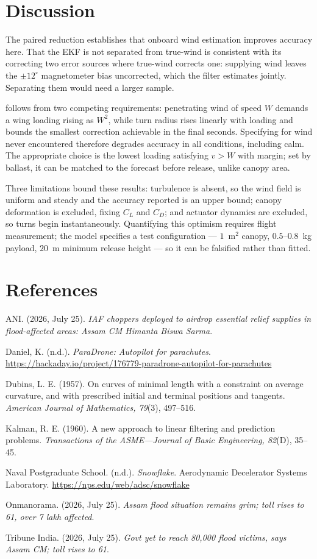 \documentclass[11pt,a4paper]{article}
\begin{document}
\section{Discussion}

The paired reduction establishes that onboard wind estimation improves accuracy
here. That the EKF is not separated from true-wind is consistent with its
correcting two error sources where true-wind corrects one: supplying wind leaves
the $\pm12^{\circ}$ magnetometer bias uncorrected, which the filter estimates
jointly. Separating them would need a larger sample.

 follows from two competing requirements: penetrating wind of
speed $W$ demands a wing loading rising as $W^{2}$, while turn radius rises
linearly with loading and bounds the smallest correction achievable in the final
seconds. Specifying for wind never encountered therefore degrades accuracy in all
conditions, including calm. The appropriate choice is the lowest
loading satisfying $v > W$ with margin; set by ballast, it can be matched to the
forecast before release, unlike canopy area.

Three limitations bound these results: turbulence is absent, so the wind field is
uniform and steady and the accuracy reported is an upper bound; canopy
deformation is excluded, fixing $C_L$ and $C_D$; and actuator dynamics are
excluded, so turns begin instantaneously. Quantifying this optimism requires
flight measurement; the model specifies a test configuration ---
$1$~m$^{2}$ canopy, $0.5$--$0.8$~kg payload, $20$~m minimum release height ---
so it can be falsified rather than fitted.

\section*{References}
\small
ANI. (2026, July 25). \emph{IAF choppers deployed to airdrop essential relief
supplies in flood-affected areas: Assam CM Himanta Biswa Sarma}.

Daniel, K. (n.d.). \emph{ParaDrone: Autopilot for parachutes}.
\url{https://hackaday.io/project/176779-paradrone-autopilot-for-parachutes}

Dubins, L. E. (1957). On curves of minimal length with a constraint on average
curvature, and with prescribed initial and terminal positions and tangents.
\emph{American Journal of Mathematics, 79}(3), 497--516.

Kalman, R. E. (1960). A new approach to linear filtering and prediction problems.
\emph{Transactions of the ASME---Journal of Basic Engineering, 82}(D), 35--45.

Naval Postgraduate School. (n.d.). \emph{Snowflake}. Aerodynamic Decelerator
Systems Laboratory. \url{https://nps.edu/web/adsc/snowflake}

Onmanorama. (2026, July 25). \emph{Assam flood situation remains grim; toll rises
to 61, over 7 lakh affected}.

Tribune India. (2026, July 25). \emph{Govt yet to reach 80,000 flood victims,
says Assam CM; toll rises to 61}.
\end{document}
